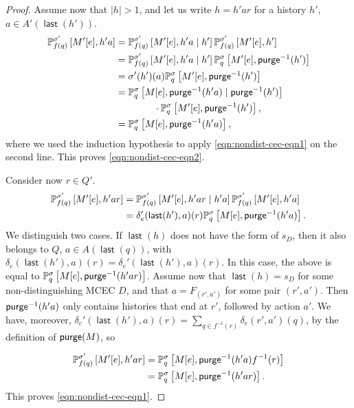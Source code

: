 \documentclass[a4paper,USenglish,cleveref, autoref, thm-restate]{lipics-v2021}
\def\abs#1{\ensuremath{\lvert #1 \rvert}}
\newcommand*{\pr}{\mathbb{P}}
\newcommand{\last}{\operatorname{\mathsf{last}}}
\newcommand\freshaction[1]{F_{#1}}
\newcommand\purge[1]{\textrm{\sf purge}(#1)}
\newcommand\purgeinv[1]{\textrm{\sf purge}^{-1}(#1)}
\begin{document}
\begin{proof}
  Assume now that $\abs{h}>1$, and let us write $h=h'ar$ for a history $h'$, $a\in A'(\last(h'))$.
  \begin{align*}
    \pr^{\sigma'}_{f(q)}\left[M'[e], h'a \right] &= \pr^{\sigma'}_{f(q)}\left[M'[e], h'a \mid h'\right]\pr^{\sigma'}_{f(q)}\left[M'[e], h' \right]\\
    &=\pr^{\sigma'}_{f(q)}\left[M'[e], h'a \mid h'\right]\pr^{\sigma}_{q}\left[M'[e], \purgeinv{h'} \right] \\
    &=\sigma'(h')(a) \pr^{\sigma}_{q}\left[M'[e], \purgeinv{h'} \right] \\
    &=\pr^\sigma_q\left[M[e], \purgeinv{h'a} \mid \purgeinv{h'}\right] \\
    & \qquad\qquad \cdot \pr^{\sigma}_{q}\left[M'[e], \purgeinv{h'} \right],\\
    &=\pr^\sigma_q\left[M[e], \purgeinv{h'a} \right],
  \end{align*}
  where we used the induction hypothesis to apply \eqref{eqn:nondist-cec-eqn1} on the second line.
  This proves \eqref{eqn:nondist-cec-eqn2}.

  Consider now $r \in Q'$.
  \begin{align*}
    \pr^{\sigma'}_{f(q)}\left[M'[e], h'ar \right] &= \pr^{\sigma'}_{f(q)}\left[M'[e], h'ar \mid h'a\right]\pr^{\sigma'}_{f(q)}\left[M'[e], h'a \right]\\
    &=\delta_e'(\last(h'),a)(r)\pr^\sigma_q\left[M[e], \purgeinv{h'a} \right].
  \end{align*}
  We distinguish two cases. If $\last(h)$ does not have the form of $s_D$, then it also belongs to $Q$, $a \in A(\last(q))$,
  with $\delta_e(\last(h'),a)(r) = \delta_e'(\last(h'),a)(r)$.
  In this case, the above is equal to $\pr^\sigma_q\left[M[e], \purgeinv{h'ar} \right]$.
  Assume now that $\last(h) = s_D$ for some non-distinguishing MCEC $D$, and that 
  $a=\freshaction{(r', a')}$ for some pair $(r',a')$.
  Then $\purgeinv{h'a}$ only contains histories that end at $r'$, followed by action $a'$.
  We have, moreover, $\delta_e'(\last(h'),a)(r) = \sum_{q\in f^{-1}(r)} \delta_e(r',a')(q)$,
  by the definition of $\purge{M}$, so
  
  \begin{align*}
    \pr^{\sigma'}_{f(q)}\left[M'[e], h'ar \right] &=    \pr^\sigma_q\left[M[e], \purgeinv{h'a}f^{-1}(r) \right] \\
    &= \pr^\sigma_q\left[M[e], \purgeinv{h'ar} \right].
  \end{align*}
  This proves \eqref{eqn:nondist-cec-eqn1}.


\end{proof}
\end{document}
